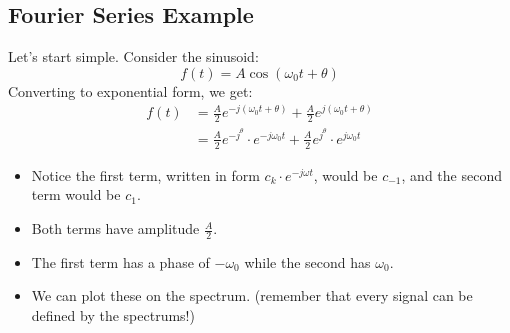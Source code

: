 \documentclass[10pt]{article}
\begin{document}
\subsection*{Fourier Series Example}
Let's start simple.  Consider the sinusoid:
\[f(t) = A \cos(\omega_0 t + \theta)\]
Converting to exponential form, we get:
\begin{align*}
    f(t) &= \frac{A}{2} e^{-j(\omega_0 t + \theta)} + \frac{A}{2} e^{j(\omega_0 t + \theta)}\\
    &= \frac{A}{2} e^{-j^\theta} \cdot e^{-j \omega_0 t} + \frac{A}{2} e^{j^\theta} \cdot e^{j\omega_0 t}
\end{align*} 
\begin{itemize}
    \item Notice the first term, written in form $c_k \cdot e^{-j\omega t}$, would be $c_{-1}$, and the second term would be $c_1$.
    \item Both terms have amplitude $\frac{A}{2}$.
    \item The first term has a phase of $-\omega_0$ while the second has $\omega_0$.
    \item We can plot these on the spectrum. (remember that every signal can be defined by the spectrums!)
\end{itemize}
\end{document}
